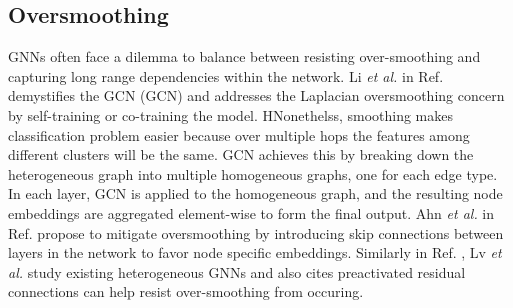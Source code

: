 \documentclass{report} %
\begin{document}
\subsection{Oversmoothing}\label{subsec:HGNN Oversmoothing}
\ac{GNN}s often face a dilemma to balance between resisting over-smoothing and capturing long range dependencies within the network.
Li \textit{et al.} in Ref. \cite{GCN-2018} demystifies the \acl{GCN} (\ac{GCN}) and addresses the Laplacian oversmoothing concern by self-training or co-training the model.
HNonethelss, smoothing makes classification problem easier because over multiple hops the features among different clusters will be the same.
\ac{GCN} achieves this by breaking down the heterogeneous graph into multiple homogeneous graphs, one for each edge type. 
In each layer, \ac{GCN} is applied to the homogeneous graph, and the resulting node embeddings are aggregated element-wise to form the final output. 
Ahn \textit{et al.} in Ref. \cite{RHGNN-2022} propose to mitigate oversmoothing by introducing skip connections between layers in the network to favor node specific embeddings.
Similarly in Ref. \cite{REF HGNN-2021}, Lv \textit{et al.} study existing heterogeneous \ac{GNN}s and also cites preactivated residual connections can help resist 
over-smoothing from occuring.
\end{document}
